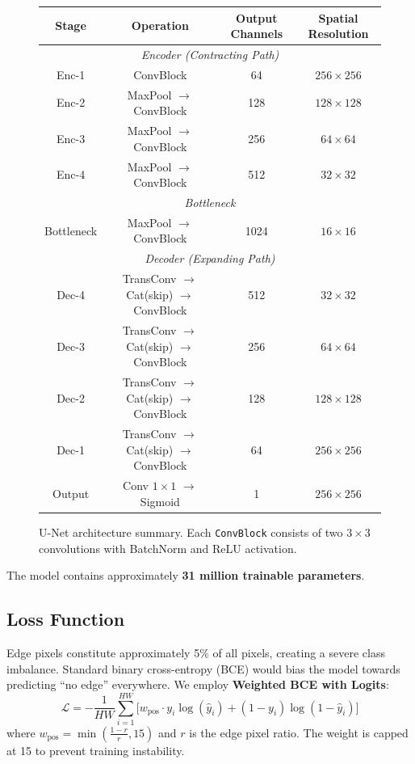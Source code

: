 \documentclass[12pt, a4paper]{article}
\begin{document}
\begin{figure}[H]
    \centering
    \small
    \begin{tabular}{cccc}
        \toprule
        \textbf{Stage} & \textbf{Operation} & \textbf{Output Channels} & \textbf{Spatial Resolution} \\
        \midrule
        \multicolumn{4}{c}{\textit{Encoder (Contracting Path)}} \\
        \midrule
        Enc-1 & ConvBlock & 64   & $256 \times 256$ \\
        Enc-2 & MaxPool $\to$ ConvBlock & 128  & $128 \times 128$ \\
        Enc-3 & MaxPool $\to$ ConvBlock & 256  & $64 \times 64$   \\
        Enc-4 & MaxPool $\to$ ConvBlock & 512  & $32 \times 32$   \\
        \midrule
        \multicolumn{4}{c}{\textit{Bottleneck}} \\
        \midrule
        Bottleneck & MaxPool $\to$ ConvBlock & 1024 & $16 \times 16$ \\
        \midrule
        \multicolumn{4}{c}{\textit{Decoder (Expanding Path)}} \\
        \midrule
        Dec-4 & TransConv $\to$ Cat(skip) $\to$ ConvBlock & 512  & $32 \times 32$   \\
        Dec-3 & TransConv $\to$ Cat(skip) $\to$ ConvBlock & 256  & $64 \times 64$   \\
        Dec-2 & TransConv $\to$ Cat(skip) $\to$ ConvBlock & 128  & $128 \times 128$ \\
        Dec-1 & TransConv $\to$ Cat(skip) $\to$ ConvBlock & 64   & $256 \times 256$ \\
        \midrule
        Output & Conv $1\times1$ $\to$ Sigmoid & 1 & $256 \times 256$ \\
        \bottomrule
    \end{tabular}
    \caption{U-Net architecture summary. Each \texttt{ConvBlock} consists of two $3\times3$ convolutions with BatchNorm and ReLU activation.}
    \label{tab:architecture}
\end{figure}

The model contains approximately \textbf{31 million trainable parameters}.

\subsection{Loss Function}

Edge pixels constitute approximately 5\% of all pixels, creating a severe class imbalance.
Standard binary cross-entropy (BCE) would bias the model towards predicting ``no edge'' everywhere.
We employ \textbf{Weighted BCE with Logits}:
\[
    \mathcal{L} = -\frac{1}{HW} \sum_{i=1}^{HW} \Big[ w_{\text{pos}} \cdot y_i \log(\hat{y}_i) + (1 - y_i) \log(1 - \hat{y}_i) \Big]
\]
where $w_{\text{pos}} = \min\!\left(\frac{1 - r}{r}, 15\right)$ and $r$ is the edge pixel ratio.
The weight is capped at 15 to prevent training instability.
\end{document}
